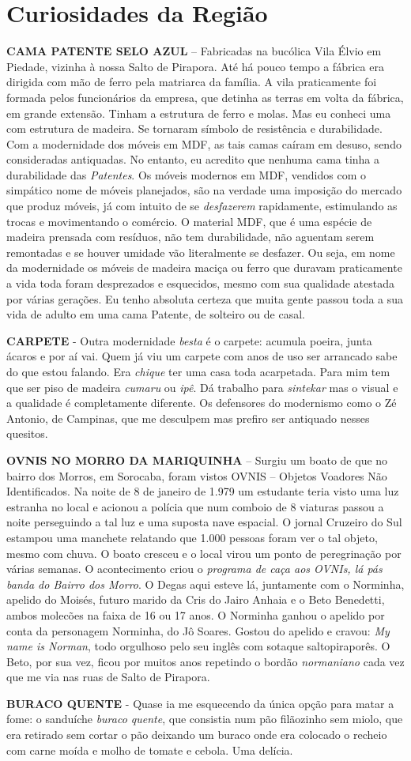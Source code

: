 \documentclass[12pt,brazil,]{book}
\begin{document}
\section{Curiosidades da Região}\label{curiosidades-da-regiuxe3o}

\textbf{CAMA PATENTE SELO AZUL} -- Fabricadas na bucólica Vila Élvio em
Piedade, vizinha à nossa Salto de Pirapora. Até há pouco tempo a fábrica
era dirigida com mão de ferro pela matriarca da família. A vila
praticamente foi formada pelos funcionários da empresa, que detinha as
terras em volta da fábrica, em grande extensão. Tinham a estrutura de
ferro e molas. Mas eu conheci uma com estrutura de madeira. Se tornaram
símbolo de resistência e durabilidade. Com a modernidade dos móveis em
MDF, as tais camas caíram em desuso, sendo consideradas antiquadas. No
entanto, eu acredito que nenhuma cama tinha a durabilidade das
\emph{Patentes}. Os móveis modernos em MDF, vendidos com o simpático
nome de móveis planejados, são na verdade uma imposição do mercado que
produz móveis, já com intuito de se \emph{desfazerem} rapidamente,
estimulando as trocas e movimentando o comércio. O material MDF, que é
uma espécie de madeira prensada com resíduos, não tem durabilidade, não
aguentam serem remontadas e se houver umidade vão literalmente se
desfazer. Ou seja, em nome da modernidade os móveis de madeira maciça ou
ferro que duravam praticamente a vida toda foram desprezados e
esquecidos, mesmo com sua qualidade atestada por várias gerações. Eu
tenho absoluta certeza que muita gente passou toda a sua vida de adulto
em uma cama Patente, de solteiro ou de casal.

\textbf{CARPETE} - Outra modernidade \emph{besta} é o carpete: acumula
poeira, junta ácaros e por aí vai. Quem já viu um carpete com anos de
uso ser arrancado sabe do que estou falando. Era \emph{chique} ter uma
casa toda acarpetada. Para mim tem que ser piso de madeira \emph{cumaru}
ou \emph{ipê}. Dá trabalho para \emph{sintekar} mas o visual e a
qualidade é completamente diferente. Os defensores do modernismo como o
Zé Antonio, de Campinas, que me desculpem mas prefiro ser antiquado
nesses quesitos.

\textbf{OVNIS NO MORRO DA MARIQUINHA} -- Surgiu um boato de que no
bairro dos Morros, em Sorocaba, foram vistos OVNIS -- Objetos Voadores
Não Identificados. Na noite de 8 de janeiro de 1.979 um estudante teria
visto uma luz estranha no local e acionou a polícia que num comboio de 8
viaturas passou a noite perseguindo a tal luz e uma suposta nave
espacial. O jornal Cruzeiro do Sul estampou uma manchete relatando que
1.000 pessoas foram ver o tal objeto, mesmo com chuva. O boato cresceu e
o local virou um ponto de peregrinação por várias semanas. O
acontecimento criou o \emph{programa de caça aos OVNIs, lá pás banda do
Bairro dos Morro}. O Degas aqui esteve lá, juntamente com o Norminha,
apelido do Moisés, futuro marido da Cris do Jairo Anhaia e o Beto
Benedetti, ambos molecões na faixa de 16 ou 17 anos. O Norminha ganhou o
apelido por conta da personagem Norminha, do Jô Soares. Gostou do
apelido e cravou: \emph{My name is Norman}, todo orgulhoso pelo seu
inglês com sotaque saltopiraporês. O Beto, por sua vez, ficou por muitos
anos repetindo o bordão \emph{normaniano} cada vez que me via nas ruas
de Salto de Pirapora.

\textbf{BURACO QUENTE} - Quase ia me esquecendo da única opção para
matar a fome: o sanduíche \emph{buraco quente}, que consistia num pão
filãozinho sem miolo, que era retirado sem cortar o pão deixando um
buraco onde era colocado o recheio com carne moída e molho de tomate e
cebola. Uma delícia.
\end{document}
